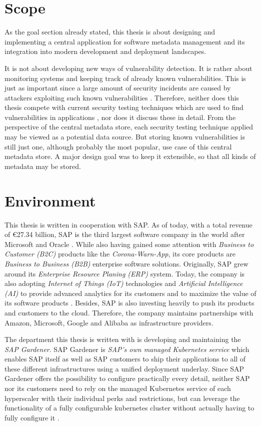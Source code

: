 \section{Scope}
As the goal section already stated, this thesis is about designing and implementing a central application for software metadata management and its integration into modern development and deployment landscapes.\par
It is not about developing new ways of vulnerability detection. It is rather about monitoring systems and keeping track of already known vulnerabilities. This is just as important since a large amount of security incidents are caused by attackers exploiting such known vulnerabilities \cite{ModelBasedSecurityTesting}. Therefore, neither does this thesis compete with current security testing techniques which are used to find vulnerabilities in applications \cite{SecurityTesting}, nor does it discuss these in detail. From the perspective of the central metadata store, each security testing technique applied may be viewed as a potential data source. But storing known vulnerabilities is still just one, although probably the most popular, use case of this central metadata store. A major design goal was to keep it extensible, so that all kinds of metadata may be stored.  

\section{Environment}
This thesis is written in cooperation with SAP. As of today, with a total revenue of €27.34 billion, SAP is the third largest software company in the world after Microsoft and Oracle \cite{LargestSoftwareCompanies}. While also having gained some attention with \textit{Business to Customer (B2C)} products like the \textit{Corona-Warn-App}, its core products are \textit{Business to Business (B2B)} enterprise software solutions. Originally, SAP grew around its \textit{Enterprise Resource Planing (ERP)} system. Today, the company is also adopting \textit{Internet of Things (IoT)} technologies and \textit{Artificial Intelligence (AI)} to provide advanced analytics for its customers and to maximize the value of its software products \cite{AboutSAP}. Besides, SAP is also investing heavily to push its products and customers to the cloud. Therefore, the company maintains partnerships with Amazon, Microsoft, Google and Alibaba as infrastructure providers.\par 
The department this thesis is written with is developing and maintaining the \textit{SAP Gardener}. SAP Gardener is \textit{SAP's own managed Kubernetes service} which enables SAP itself as well as SAP customers to ship their applications to all of these different infrastructures using a unified deployment underlay. Since SAP Gardener offers the possibility to configure practically every detail, neither SAP nor its customers need to rely on the managed Kubernetes service of each hyperscaler with their individual perks and restrictions, but can leverage the functionality of a fully configurable kubernetes cluster without actually having to fully configure it \cite{GardenerValueProposition}. 
   
